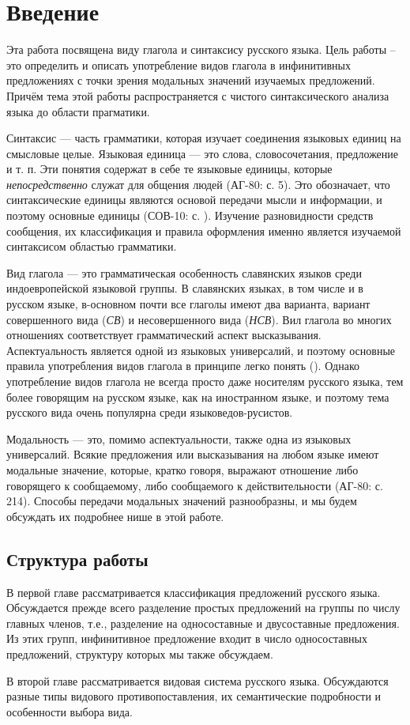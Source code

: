 \section{Введение}

Эта работа посвящена виду глагола и синтаксису русского языка. Цель работы -- это определить и описать употребление видов глагола в инфинитивных предложениях с точки зрения модальных значений изучаемых предложений. Причём тема этой работы распространяется с чистого синтаксического анализа языка до области прагматики.

Синтаксис --- часть грамматики, которая изучает соединения языковых единиц на смысловые целые. Языковая единица --- это слова, словосочетания, предложение и т. п. Эти понятия содержат в себе те языковые единицы, которые \textit{непосредственно} служат для общения людей (АГ-80: с. 5). Это обозначает, что синтаксические единицы являются основой передачи мысли и информации, и поэтому основные единицы (СОВ-10: с. ). Изучение разновидности средств сообщения, их классификация и правила оформления именно является изучаемой синтаксисом областью грамматики.

Вид глагола --- это грамматическая особенность славянских языков среди индоевропейской языковой группы. В славянских языках, в том числе и в русском языке, в-основном почти все глаголы имеют два варианта, вариант совершенного вида (\textit{СВ}) и несовершенного вида (\textit{НСВ}). Вил глагола во многих отношениях соответствует грамматический аспект высказывания. Аспектуальность является одной из языковых универсалий, и поэтому основные правила употребления видов глагола в принципе легко понять (). Однако употребление видов глагола не всегда просто даже носителям русского языка, тем более говорящим на русском языке, как на иностранном языке, и поэтому тема русского вида очень популярна среди языковедов-русистов.

Модальность --- это, помимо аспектуальности, также одна из языковых универсалий. Всякие предложения или высказывания на любом языке имеют модальные значение, которые, кратко говоря, выражают отношение либо говорящего к сообщаемому, либо сообщаемого к действительности (АГ-80: с. 214). Способы передачи модальных значений разнообразны, и мы будем обсуждать их подробнее нише в этой работе.

\subsection*{Структура работы}

В первой главе рассматривается классификация предложений русского языка. Обсуждается прежде всего разделение простых предложений на группы по числу главных членов, т.е., разделение на односоставные и двусоставные предложения. Из этих групп, инфинитивное предложение входит в число односоставных предложений, структуру которых мы также обсуждаем.

В второй главе рассматривается видовая система русского языка.	 Обсуждаются разные типы видового противопоставления, их семантические подробности и особенности выбора вида.  

